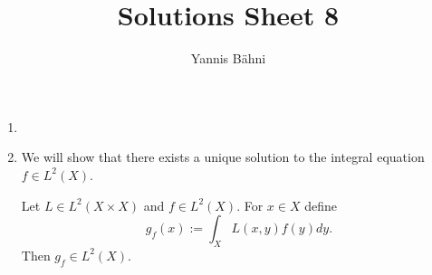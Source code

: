 

\title{Solutions Sheet 8}
\author{Yannis B\"{a}hni}
\address[Yannis B\"{a}hni]{University of Zurich, R\"{a}mistrasse 71, 8006 Zurich}



\maketitle
\thispagestyle{fancy}

\setcounter{section}{1}

\begin{enumerate}[label = \textbf{Exercise \arabic*.},wide = 0pt, itemsep = 1.5ex]
	\item
	\item We will show that there exists a unique solution to the integral equation $f \in L^2(X)$. 
		\begin{lemma}
			Let $L \in L^2(X \times X)$ and $f \in L^2(X)$. For $x \in X$ define
			\begin{equation*}
				g_f(x) := \int_X L(x,y)f(y)dy.
			\end{equation*}
			Then $g_f \in L^2(X)$.
			\label{lem:L^2}
		\end{lemma}


\end{enumerate}
